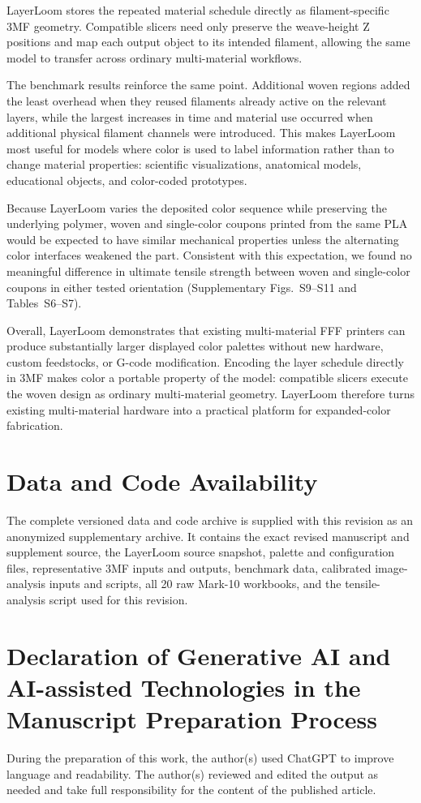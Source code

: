 \documentclass[5p,times,numbers]{elsarticle}
\begin{document}
LayerLoom stores the repeated material schedule directly as filament-specific 3MF geometry. Compatible slicers need only preserve the weave-height Z positions and map each output object to its intended filament, allowing the same model to transfer across ordinary multi-material workflows.

The benchmark results reinforce the same point. Additional woven regions added the least overhead when they reused filaments already active on the relevant layers, while the largest increases in time and material use occurred when additional physical filament channels were introduced. This makes LayerLoom most useful for models where color is used to label information rather than to change material properties: scientific visualizations, anatomical models, educational objects, and color-coded prototypes.

Because LayerLoom varies the deposited color sequence while preserving the underlying polymer, woven and single-color coupons printed from the same PLA would be expected to have similar mechanical properties unless the alternating color interfaces weakened the part. Consistent with this expectation, we found no meaningful difference in ultimate tensile strength between woven and single-color coupons in either tested orientation (Supplementary Figs.~S9--S11 and Tables~S6--S7).

Overall, LayerLoom demonstrates that existing multi-material FFF printers can produce substantially larger displayed color palettes without new hardware, custom feedstocks, or G-code modification. Encoding the layer schedule directly in 3MF makes color a portable property of the model: compatible slicers execute the woven design as ordinary multi-material geometry. LayerLoom therefore turns existing multi-material hardware into a practical platform for expanded-color fabrication.



\section*{Data and Code Availability}
The complete versioned data and code archive is supplied with this revision as an anonymized supplementary archive. It contains the exact revised manuscript and supplement source, the LayerLoom source snapshot, palette and configuration files, representative 3MF inputs and outputs, benchmark data, calibrated image-analysis inputs and scripts, all 20 raw Mark-10 workbooks, and the tensile-analysis script used for this revision.

\section*{Declaration of Generative AI and AI-assisted Technologies in the Manuscript Preparation Process}
During the preparation of this work, the author(s) used ChatGPT to improve language and readability. The author(s) reviewed and edited the output as needed and take full responsibility for the content of the published article. 






\end{document}
